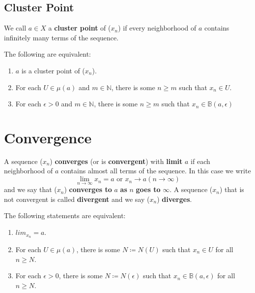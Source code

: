 \subsection*{Cluster Point}

\begin{definition}\label{def: cluster_pt}
    We call \(a \in X\) a \textbf{cluster point} of (\(x_n\)) if every neighborhood of 
    \(a\) contains infinitely many terms of the sequence. 
\end{definition}

\begin{proposition}
    The following are equivalent: 
    \begin{enumerate}[label=(\roman*)]
        \item \(a\) is a cluster point of (\(x_n\)). 
        \item For each \(U \in \mu\left(a\right)\) and \(m \in \mathbb{N}\), there is some 
        \(n \geq m\) such that \(x_n \in U\). 
        \item For each \(\epsilon > 0\) and \(m \in \mathbb{N}\), there is some \(n \geq m\)
        such that \(x_n \in \mathbb{B}\left(a, \epsilon\right)\)
    \end{enumerate}
\end{proposition}

\section{Convergence}

\begin{definition}[Convergence]\label{def: convergence}
    A sequence (\(x_n\)) \textbf{converges} (or is \textbf{convergent}) with \textbf{limit}
    \(a\) if each neighborhood of \(a\) contains almost all terms of the sequence. In this 
    case we write 
    \[
        \displaystyle{\lim_{n \to \infty}} x_n = a \text{    or    } x_n \to a (n \to \infty)  
    \]
    and we say that (\(x_n\)) \textbf{converges to} \(a\) \textbf{as} \(n\) \textbf{goes to}
    \(\infty\). A sequence (\(x_n\)) that is not convergent is called \textbf{divergent}
    and we say (\(x_n\)) \textbf{diverges}. 
\end{definition}

\begin{proposition}
    The following statements are equivalent:
    \begin{enumerate}[label=(\roman*)]
        \item \(lim_{x_n} = a\). 
        \item For each \(U \in \mu\left(a\right)\), there is some \(N \coloneqq N\left(U\right)\)
        such that \(x_n \in U\) for all \(n \geq N\). 
        \item For each \(\epsilon > 0\), there is some \(N \coloneqq N\left(\epsilon\right)\)
        such that \(x_n \in \mathbb{B}\left(a, \epsilon\right)\) for all \(n \geq N\).  
    \end{enumerate}
\end{proposition}


